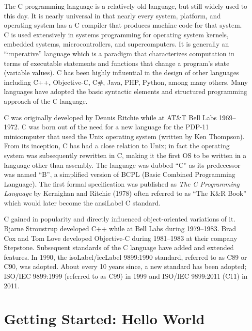 

The C programming language is a relatively old language, but still widely used to this
day.  It is nearly universal in that nearly every system, platform, and operating system
has a C compiler that produces machine code for that system.  C is used extensively
in systems programming for operating system kernels, embedded systems, microcontrollers, 
and supercomputers.  It is generally an ``imperative'' language which is a paradigm that
characterizes computation in terms of executable statements and functions that change 
a program's state (variable values).  C has been highly influential in the design of other
languages including C++, Objective-C, C\#, Java, PHP, Python, among many others.  
Many languages have adopted the basic syntactic elements and structured programming 
approach of the C language.

C was originally developed by Dennis Ritchie while at AT\&T Bell Labs 1969--1972.  C was
born out of the need for a new language for the PDP-11 minicomputer that used the 
Unix operating system (written by Ken Thompson).  From its inception, C has had a close relation to Unix; in fact the
operating system was subsequently rewritten in C, making it the first OS to be written in 
a language other than assembly.  The language was dubbed ``C'' as its predecessor was
named ``B'', a simplified version of BCPL (Basic Combined Programming Language).  
The first formal specification was published as \emph{The C Programming Language} by
Kernighan and Ritchie (1978) \cite{Kernighan:1988:CPL:576122} often referred to as 
``The K\&R Book'' which would later become the \gls{ansiLabel} C standard.

C gained in popularity and directly influenced object-oriented variations of it.  
Bjarne Stroustrup developed C++ while at Bell Labs during 1979--1983.  
Brad Cox and Tom Love developed Objective-C during 1981--1983 at their
company Stepstone.  Subsequent standards of the C language have added
and extended features.  In 1990, the \gls{isoLabel}/\gls{iecLabel} 9899:1990 
standard, referred to as C89 or C90, was adopted.  About every 10 years 
since, a new standard has been adopted; ISO/IEC 9899:1999 (referred
to as C99) in 1999 and ISO/IEC 9899:2011 (C11) in 2011.

\section{Getting Started: Hello World}

